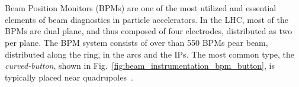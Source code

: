 \section{}


\subsection{}

Beam Position Monitors (BPMs) are one of the most utilized and essential elements of beam 
diagnostics in particle accelerators. In the LHC, most of the BPMs are dual plane, and thus composed
of four electrodes, distributed as two per plane. The BPM system consists of over than 550 BPMs pear
beam, distributed along the ring, in the arcs and the IPs. The most common type, the
\textit{curved-button}, shown in Fig.~\ref{fig:beam_instrumentation_bpm_button}, is typically placed
near quadrupoles~\cite{wendt_bpm_2020}.

